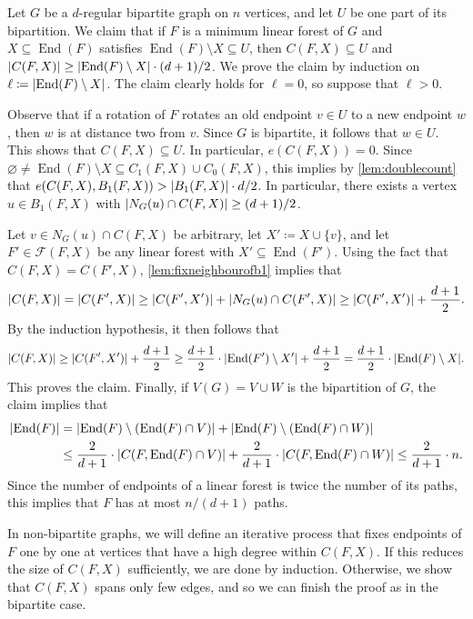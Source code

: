 \documentclass[11pt]{article}
\makeatletter
\theoremstyle{plain}
\theoremstyle{definition}
\renewenvironment{proof}[1][\proofname]
{\par\pushQED{\qed}
	\normalfont\topsep6\p@\@plus6\p@\relax\trivlist
	\item[\hskip\labelsep\bfseries#1\@addpunct{.}]
	\ignorespaces}
{\popQED\endtrivlist\@endpefalse}
\let\emptyset\varnothing
\newcommand{\cF}{\mathcal F}
\DeclarePairedDelimiter{\abs}{\lvert}{\rvert}
\DeclareMathOperator{\End}{End}
\makeatother
\begin{document}
\begin{proof}
    Let $G$ be a $d$-regular bipartite graph on $n$ vertices, and let $U$ be one part of its bipartition. We claim that if $F$ is a minimum linear forest of $G$ and $X \subseteq \End(F)$ satisfies $\End(F) \setminus X \subseteq U$, then $C(F,X) \subseteq U$ and $\abs{C(F,X)} \ge \abs{\End(F) \setminus X} \cdot (d+1)/2$. We prove the claim by induction on $\ell \coloneqq \abs{\End(F) \setminus X}$. The claim clearly holds for $\ell = 0$, so suppose that $\ell > 0$.

    Observe that if a rotation of $F$ rotates an old endpoint $v \in U$ to a new endpoint $w$, then $w$ is at distance two from $v$. Since $G$ is bipartite, it follows that $w \in U$. This shows that $C(F,X) \subseteq U$. In particular, $e(C(F,X)) = 0$. Since $\emptyset \neq \End(F) \setminus X \subseteq C_1(F,X) \cup C_0(F,X)$, this implies by \cref{lem:doublecount} that $e(C(F,X),B_1(F,X)) > \abs{B_1(F,X)} \cdot d/2$. In particular, there exists a vertex $u \in B_1(F,X)$ with $\abs{N_G(u) \cap C(F,X)} \ge (d+1)/2$.

    Let $v \in N_G(u) \cap C(F,X)$ be arbitrary, let $X' \coloneqq X \cup \{v\}$, and let $F' \in \cF(F,X)$ be any linear forest with $X' \subseteq \End(F')$. Using the fact that $C(F,X) = C(F',X)$, \cref{lem:fixneighbourofb1} implies that
    \[
        \abs{C(F,X)} = \abs{C(F',X)} \ge \abs{C(F',X')} + \abs{N_G(u) \cap C(F',X)} \ge \abs{C(F',X')} + \frac{d+1}{2}.
    \]
    By the induction hypothesis, it then follows that
    \[
        \abs{C(F,X)} \ge \abs{C(F',X')} + \frac{d+1}{2} \ge \frac{d+1}{2} \cdot \abs{\End(F') \setminus X'} + \frac{d+1}{2} = \frac{d+1}{2} \cdot \abs{\End(F) \setminus X}.
    \]
    This proves the claim. Finally, if $V(G) = V \cup W$ is the bipartition of $G$, the claim implies that
    \begin{align*}
        \abs{\End(F)} & = \abs{\End(F) \setminus (\End(F) \cap V)} + \abs{\End(F) \setminus (\End(F) \cap W)} \\
        & \le \frac{2}{d+1} \cdot \abs{C(F,\End(F) \cap V)} + \frac{2}{d+1} \cdot \abs{C(F,\End(F) \cap W)} \le \frac{2}{d+1} \cdot n.
    \end{align*}
    Since the number of endpoints of a linear forest is twice the number of its paths, this implies that $F$ has at most $n/(d+1)$ paths.
\end{proof}

In non-bipartite graphs, we will define an iterative process that fixes endpoints of $F$ one by one at vertices that have a high degree within $C(F,X)$. If this reduces the size of $C(F,X)$ sufficiently, we are done by induction. Otherwise, we show that $C(F,X)$ spans only few edges, and so we can finish the proof as in the bipartite case.
\end{document}
